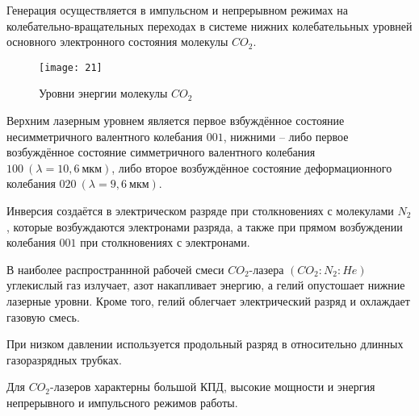 Генерация осуществляется в импульсном и непрерывном режимах на 
колебательно-вращательных переходах в системе нижних колебателььных уровней 
основного электронного состояния молекулы \( CO_2 \).
\begin{figure}[h]
    \center
    \texttt{[image: 21]}
    \caption{Уровни энергии молекулы \( CO_2 \)}
\end{figure}
Верхним лазерным уровнем является первое взбуждённое состояние несимметричного 
валентного колебания \( 001 \), нижними -- либо первое возбуждённое состояние 
симметричного валентного колебания \( 100\ (\lambda=10,6~\text{мкм}) \), либо 
второе возбуждённое состояние деформационного колебания 
\( 020\ (\lambda=9,6~\text{мкм}) \).

Инверсия создаётся в электрическом разряде при столкновениях с молекулами 
\( N_2 \), которые возбуждаются электронами разряда, а также при прямом 
возбуждении колебания \( 001 \) при столкновениях с электронами.

В наиболее распространнной рабочей смеси \( CO_2 \)-лазера \((CO_2:N_2:He)\) 
углекислый газ излучает, азот накапливает энергию, а гелий опустошает нижние 
лазерные уровни. Кроме того, гелий облегчает электрический разряд и охлаждает 
газовую смесь.

При низком давлении используется продольный разряд в относительно длинных 
газоразрядных трубках.

Для \( CO_2 \)-лазеров характерны большой КПД, высокие мощности и энергия 
непрерывного и импульсного режимов работы.